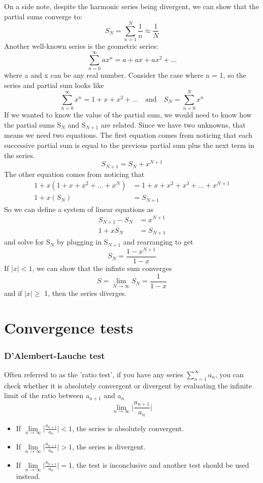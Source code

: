 \documentclass{article}
\newcommand{\be}{\begin{equation}}
\newcommand{\ee}{\end{equation}}
\begin{document}
On a side note, despite the harmonic series being divergent, we can show that the partial sums converge to:
\be
S_N = \sum_{n=1}^{N} \frac{1}{n} \approx \frac{1}{N}
\ee
Another well-known series is the geometric series:
\be
\sum_{n=0}^{\infty} a x^n = a + ax + ax^2 + \hdots
\ee
where a and x can be any real number.
Consider the case where a = 1, so the series and partial sum looks like
\be
\sum_{n=0}^{\infty} x^n = 1 + x + x^2 + \hdots \quad \text{and} \quad S_N = \sum_{n=0}^{N} x^n
\ee
If we wanted to know the value of the partial sum, we would need to know how the partial sums S$_N$ and S$_{N+1}$ are related.
Since we have two unknowns, that means we need two equations.
The first equation comes from noticing that each successive partial sum is equal to the previous partial sum plus the next term in the series.
\be
S_{N+1} = S_N + x^{N+1}
\ee
The other equation comes from noticing that
\be
\begin{split}
1 + x(1 + x + x^2 + \hdots + x^N) &= 1 + x + x^2 + x^3 + \hdots + x^{N+1} \\
1 + x (S_N) &= S_{N+1}
\end{split}
\ee
So we can define a system of linear equations as
\be
\begin{split}
S_{N+1} - S_N &= x^{N+1} \\
1 + xS_N &= S_{N+1}
\end{split}
\ee
and solve for S$_N$ by plugging in S$_{N+1}$ and rearranging to get
\be
S_N = \frac{1-x^{N+1}}{1-x}
\ee
If $|x| < 1$, we can show that the infinte sum converges
\be
S = \lim_{N \to \infty}S_N = \frac{1}{1-x}
\ee
and if $|x|\geq$ 1, then the series diverges.
\section*{Convergence tests}
\subsubsection*{D'Alembert-Lauche test}
Often referred to as the 'ratio test', if you have any series $\sum\limits_{n=1}^{\infty} a_n$, you can check whether it is absolutely convergent or divergent by evaluating the infinite limit of the ratio between a$_{n+1}$ and a$_n$
\be
\lim_{n \to \infty} \Big| \frac{a_{n+1}}{a_n} \Big|
\ee
\begin{itemize}
  \item If $\lim\limits_{n \to \infty} \Big| \frac{a_{n+1}}{a_n} \Big| < 1$, the series is absolutely convergent.
  \item If $\lim\limits_{n \to \infty} \Big| \frac{a_{n+1}}{a_n} \Big| > 1$, the series is divergent.
  \item If $\lim\limits_{n \to \infty} \Big| \frac{a_{n+1}}{a_n} \Big| = 1$, the test is inconclusive and another test should be used instead.
\end{itemize}
\end{document}
